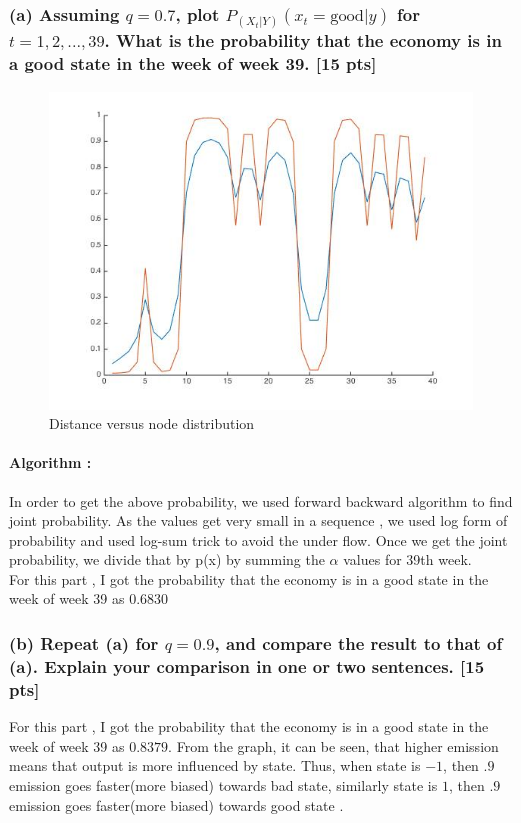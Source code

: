 \documentclass[twoside,11pt]{article}\usepackage{amsmath,amsfonts,amsthm,fullpage}
\begin{document}
\subsubsection*{(a) Assuming $q = 0.7$, plot $P_{(X_t|Y)}(x_t = \text{good}|y)$ for $t = 1,2,...,39$. What is the probability that the economy is in a good state in the week of week 39. [15 pts]}
\begin{figure}[h]
\begin{center}
\includegraphics[width=5in]{output.jpg}
\caption{Distance versus node distribution}
\end{center}
\end{figure}
\paragraph{Algorithm :} 
 In order to get the above probability, we used forward backward algorithm to find joint probability. As the values get very small in a sequence , we used log form of probability and used log-sum trick to avoid the under flow.
 Once we get the joint probability, we divide that by p(x) by summing the $\alpha $ values for 39th week. \\ [.25cm]
 
 For this part , I got the probability that the economy is in a good state in the week of week 39 as $0.6830$
\subsubsection*{(b) Repeat (a) for $q = 0.9$, and compare the result to that of (a). Explain your comparison in one or two sentences. [15 pts]}
 For this part , I got the probability that the economy is in a good state in the week of week 39 as $0.8379$. From the graph, it can be seen, that higher emission means that output is more influenced by state. Thus, when state is $-1$, then $.9$ emission goes faster(more biased) towards bad state, similarly  state is $1$, then $.9$ emission goes faster(more biased) towards good state .
\end{document}
